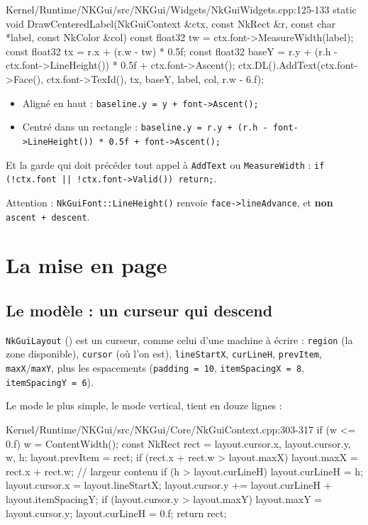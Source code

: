 \begin{nkcode}{Kernel/Runtime/NKGui/src/NKGui/Widgets/NkGuiWidgets.cpp:125-133}
static void DrawCenteredLabel(NkGuiContext &ctx, const NkRect &r, const char *label, const NkColor &col) {
    const float32 tw = ctx.font->MeasureWidth(label);
    const float32 tx = r.x + (r.w - tw) * 0.5f;
    const float32 baseY = r.y + (r.h - ctx.font->LineHeight()) * 0.5f + ctx.font->Ascent();
    ctx.DL().AddText(ctx.font->Face(), ctx.font->TexId(), {tx, baseY}, label, col, r.w - 6.f);
}
\end{nkcode}

\begin{nkretenir}
\begin{itemize}
  \item Aligné en haut : \texttt{baseline.y = y + font->Ascent();}
  \item Centré dans un rectangle :
        \texttt{baseline.y = r.y + (r.h - font->LineHeight()) * 0.5f + font->Ascent();}
\end{itemize}
Et la garde qui doit précéder tout appel à \texttt{AddText} ou
\texttt{MeasureWidth} : \texttt{if (!ctx.font || !ctx.font->Valid()) return;}.
\end{nkretenir}

Attention : \texttt{NkGuiFont::LineHeight()} renvoie \texttt{face->lineAdvance},
et \textbf{non} \texttt{ascent + descent}.

\section{La mise en page}

\subsection{Le modèle : un curseur qui descend}

\texttt{NkGuiLayout} () est un curseur, comme celui
d'une machine à écrire : \texttt{region} (la zone disponible), \texttt{cursor}
(où l'on est), \texttt{lineStartX}, \texttt{curLineH}, \texttt{prevItem},
\texttt{maxX}/\texttt{maxY}, plus les espacements
(\texttt{padding = 10}, \texttt{itemSpacingX = 8},
\texttt{itemSpacingY = 6}).

Le mode le plus simple, le mode vertical, tient en douze lignes :

\begin{nkcode}{Kernel/Runtime/NKGui/src/NKGui/Core/NkGuiContext.cpp:303-317}
if (w <= 0.f) w = ContentWidth();
const NkRect rect = {layout.cursor.x, layout.cursor.y, w, h};
layout.prevItem = rect;
if (rect.x + rect.w > layout.maxX) layout.maxX = rect.x + rect.w;  // largeur contenu
if (h > layout.curLineH) layout.curLineH = h;
layout.cursor.x = layout.lineStartX;
layout.cursor.y += layout.curLineH + layout.itemSpacingY;
if (layout.cursor.y > layout.maxY) layout.maxY = layout.cursor.y;
layout.curLineH = 0.f;
return rect;
\end{nkcode}

